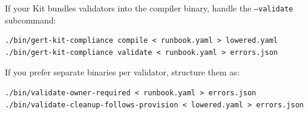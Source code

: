 If your Kit bundles validators into the compiler binary, handle the
\texttt{--validate} subcommand:

\begin{verbatim}
./bin/gert-kit-compliance compile < runbook.yaml > lowered.yaml
./bin/gert-kit-compliance validate < runbook.yaml > errors.json
\end{verbatim}

If you prefer separate binaries per validator, structure them as:

\begin{verbatim}
./bin/validate-owner-required < runbook.yaml > errors.json
./bin/validate-cleanup-follows-provision < lowered.yaml > errors.json
\end{verbatim}
